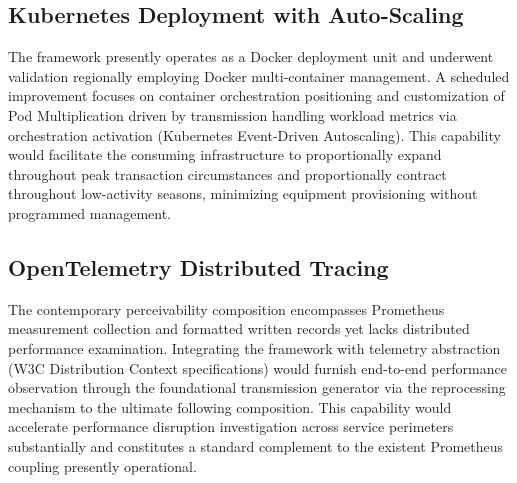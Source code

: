 \subsection{Kubernetes Deployment with Auto-Scaling}
The framework presently operates as a Docker deployment unit and underwent validation 
regionally employing Docker multi-container management. A scheduled improvement focuses on 
container orchestration positioning and customization of Pod Multiplication driven by 
transmission handling workload metrics via orchestration activation (Kubernetes Event-Driven 
Autoscaling). This capability would facilitate the consuming infrastructure to proportionally 
expand throughout peak transaction circumstances and proportionally contract throughout 
low-activity seasons, minimizing equipment provisioning without programmed management.

\subsection{OpenTelemetry Distributed Tracing}
The contemporary perceivability composition encompasses Prometheus measurement collection and 
formatted written records yet lacks distributed performance examination. Integrating the 
framework with telemetry abstraction (W3C Distribution Context specifications) would furnish 
end-to-end performance observation through the foundational transmission generator via the 
reprocessing mechanism to the ultimate following composition. This capability would accelerate 
performance disruption investigation across service perimeters substantially and constitutes a 
standard complement to the existent Prometheus coupling presently operational.


